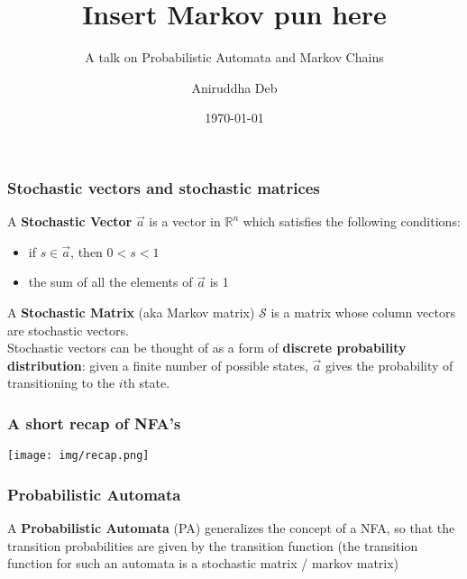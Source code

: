 \documentclass{beamer}
\title{Insert Markov pun here}
\subtitle{A talk on Probabilistic Automata and Markov Chains}
\author{Aniruddha Deb}
\institute{IIT Delhi}
\date{\today}
\begin{document}
\begin{frame}
\titlepage
\end{frame}

\begin{frame}
\frametitle{Stochastic vectors and stochastic matrices}
\pause
A \textbf{Stochastic Vector} $\vec{a}$ is a vector in $\mathbb{R}^n$ which satisfies the 
following conditions:
\begin{itemize}
	\item if $s \in \vec{a}$, then $0 < s < 1$
	\item the sum of all the elements of $\vec{a}$ is 1
\end{itemize}
\vspace{2em}
\pause
A \textbf{Stochastic Matrix} (aka Markov matrix) $\mathcal{S}$ is a matrix whose column vectors
are stochastic vectors. \\
\vspace{2em}
\pause
Stochastic vectors can be thought of as a form of \textbf{discrete probability distribution}: 
given a finite number of possible states, $\vec{a}$ gives the probability 
of transitioning to the $i$th state.
\end{frame}

\begin{frame}
\frametitle{A short recap of NFA's}

\begin{center}
\texttt{[image: img/recap.png]}
\end{center}

\end{frame}

\begin{frame}[fragile]
\frametitle{Probabilistic Automata}
A \textbf{Probabilistic Automata} (PA) generalizes the concept of a NFA, so that
the transition probabilities are given by the transition function (the transition
function for such an automata is a stochastic matrix / markov matrix)
\pause
\begin{center}
\end{center}
\end{frame}
\end{document}

